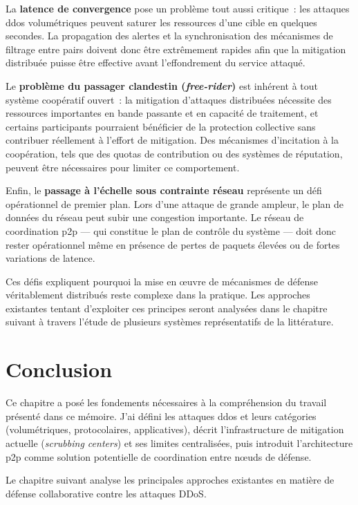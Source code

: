 La \textbf{latence de convergence} pose un problème tout aussi critique~: les attaques \gls{ddos} volumétriques peuvent saturer les ressources d'une cible en quelques secondes. La propagation des alertes et la synchronisation des mécanismes de filtrage entre pairs doivent donc être extrêmement rapides afin que la mitigation distribuée puisse être effective avant l'effondrement du service attaqué.

Le \textbf{problème du passager clandestin (\textit{free-rider})} est inhérent à tout système coopératif ouvert~: la mitigation d'attaques distribuées nécessite des ressources importantes en bande passante et en capacité de traitement, et certains participants pourraient bénéficier de la protection collective sans contribuer réellement à l'effort de mitigation. Des mécanismes d'incitation à la coopération, tels que des quotas de contribution ou des systèmes de réputation, peuvent être nécessaires pour limiter ce comportement.

Enfin, le \textbf{passage à l'échelle sous contrainte réseau} représente un défi opérationnel de premier plan. Lors d'une attaque de grande ampleur, le plan de données du réseau peut subir une congestion importante. Le réseau de coordination \gls{p2p} --- qui constitue le plan de contrôle du système --- doit donc rester opérationnel même en présence de pertes de paquets élevées ou de fortes variations de latence.

Ces défis expliquent pourquoi la mise en œuvre de mécanismes de défense véritablement distribués reste complexe dans la pratique. Les approches existantes tentant d'exploiter ces principes seront analysées dans le chapitre suivant à travers l'étude de plusieurs systèmes représentatifs de la littérature.
\section{Conclusion}

Ce chapitre a posé les fondements nécessaires à la compréhension du travail présenté dans ce mémoire. J'ai défini les attaques \gls{ddos} et leurs catégories (volumétriques, protocolaires, applicatives), décrit l'infrastructure de mitigation actuelle (\textit{scrubbing centers}) et ses limites centralisées, puis introduit l'architecture \gls{p2p} comme solution potentielle de coordination entre n\oe{}uds de défense.

Le chapitre suivant analyse les principales approches existantes en matière de défense collaborative contre les attaques DDoS.
